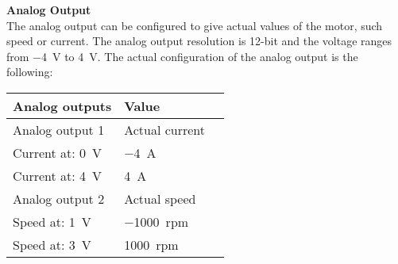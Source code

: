 \textbf{Analog Output}\\
The analog output can be configured to give actual values of the motor, such speed or current. The analog output resolution is 12-bit and the voltage ranges from \SI{-4}{V} to \SI{4}{V}. The actual configuration of the analog output is the following:
\begin{table}[H]
	\begin{tabular}{|l|l|p{4.3cm}|}
		\hline%
		\textbf{Analog outputs}       &  \textbf{Value}         \\
		\hline%
		Analog output 1                                & Actual current           \\
		\hline%
		Current at: \SI{0}{V}							  & \SI{-4}{A}              \\
		\hline%
		Current at: \SI{4}{V}							  & \SI{4}{A}              \\
		\hline%
		Analog output 2							  & Actual speed              \\
		\hline%
		Speed at: \SI{1}{V}							  & \SI{-1000}{rpm}               \\
		\hline%
		Speed at: \SI{3}{V}							  & \SI{1000}{rpm}               \\
		\hline%
	\end{tabular}
\end{table}

